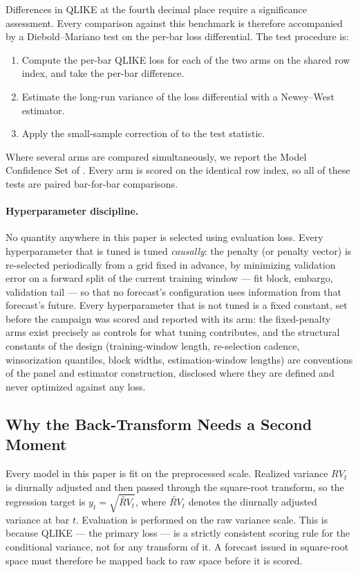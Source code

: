 Differences in QLIKE at the fourth decimal place require a significance
assessment. Every comparison against this benchmark is therefore
accompanied by a Diebold--Mariano test \citep{DieboldMariano1995} on the
per-bar loss differential. The test procedure is:
\begin{enumerate}
    \item Compute the per-bar QLIKE loss for each of the two arms on the
      shared row index, and take the per-bar difference.
    \item Estimate the long-run variance of the loss differential with a
      Newey--West estimator.
    \item Apply the small-sample correction of
      \citet{HarveyLeybourneNewbold1997} to the test statistic.
\end{enumerate}
Where several arms are compared simultaneously, we report the Model
Confidence Set of \citet{HansenLundeNason2011}. Every arm is scored on the
identical row index, so all of these tests are paired bar-for-bar
comparisons.

\paragraph{Hyperparameter discipline.} No quantity anywhere in this paper
is selected using evaluation loss. Every hyperparameter that is tuned is
tuned \emph{causally}: the penalty (or penalty vector) is re-selected
periodically from a grid fixed in advance, by minimizing validation error
on a forward split of the current training window --- fit block, embargo,
validation tail --- so that no forecast's configuration uses information
from that forecast's future. Every hyperparameter that is not tuned is a
fixed constant, set before the campaign was scored and reported with its
arm: the fixed-penalty arms exist precisely as controls for what tuning
contributes, and the structural constants of the design (training-window
length, re-selection cadence, winsorization quantiles, block widths,
estimation-window lengths) are conventions of the panel and estimator
construction, disclosed where they are defined and never optimized against
any loss.

\subsection{Why the Back-Transform Needs a Second Moment}
\label{sec:smearing_bias}

Every model in this paper is fit on the preprocessed scale. Realized variance
$RV_t$ is diurnally adjusted and then passed through the square-root
transform, so the regression target is $y_t = \sqrt{\widetilde{RV}_t}$, where
$\widetilde{RV}_t$ denotes the diurnally adjusted variance at bar $t$.
Evaluation is performed on the raw variance scale. This is because QLIKE ---
the primary loss --- is a strictly consistent scoring rule for the
conditional variance, not for any transform of it. A forecast issued in
square-root space must therefore be mapped back to raw space before it is
scored.

